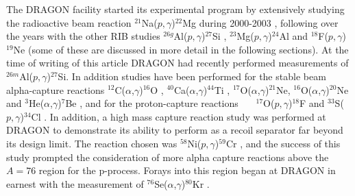 The DRAGON facility started its experimental program by extensively studying the radioactive beam reaction $^{21}$Na($p,\gamma$)$^{22}$Mg during 2000-2003 \cite{dau04}, following over the years with the other RIB studies  $^{26g}$Al($p,\gamma$)$^{27}$Si \cite{rui06}, $^{23}$Mg($p,\gamma$)$^{24}$Al \cite{eri10} and $^{18}$F($p,\gamma$)$^{19}$Ne \cite{ake13} (some of these are discussed in more detail in the following sections). At the time of writing of this article DRAGON had recently performed measurements of $^{26m}$Al($p,\gamma$)$^{27}$Si. In addition studies have been performed for the stable beam alpha-capture reactions $^{12}$C($\alpha$,$\gamma$)$^{16}$O \cite{mat06}, $^{40}$Ca($\alpha$,$\gamma$)$^{44}$Ti \cite{voc07,voc08}, $^{17}$O($\alpha$,$\gamma$)$^{21}$Ne, $^{16}$O($\alpha$,$\gamma$)$^{20}$Ne \cite{hag12b} and $^{3}$He($\alpha$,$\gamma$)$^{7}$Be \cite{sin12}, and for the proton-capture reactions ~~~$^{17}$O($p,\gamma$)$^{18}$F \cite{hag12} and $^{33}$S($p,\gamma$)$^{34}$Cl \cite{fal13}. In addition, a high mass capture reaction study was performed at DRAGON to demonstrate its ability to perform as a recoil separator far beyond its design limit. The reaction chosen was $^{58}$Ni($p,\gamma$)$^{59}$Cr \cite{Sim13}, and the success of this study prompted the consideration of more alpha capture reactions above the $A=76$ region for the p-process.  Forays into this region began at DRAGON in earnest with the measurement of $^{76}$Se($\alpha$,$\gamma$)$^{80}$Kr \cite{Fal14}. 




 
